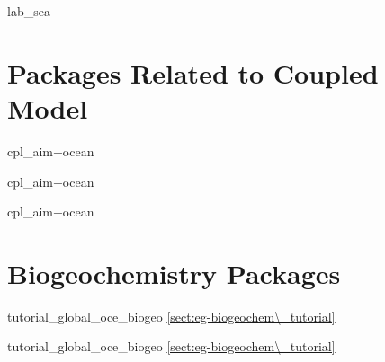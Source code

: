 \newpage

lab\_sea

\section{Packages Related to Coupled Model}
\newpage

cpl\_aim+ocean

\newpage

cpl\_aim+ocean

\newpage

cpl\_aim+ocean

\section{Biogeochemistry Packages}
\newpage

tutorial\_global\_oce\_biogeo    \ref{sect:eg-biogeochem\_tutorial}

\newpage

tutorial\_global\_oce\_biogeo    \ref{sect:eg-biogeochem\_tutorial}
